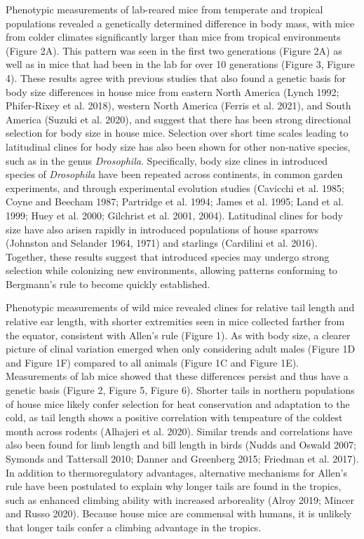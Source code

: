 \documentclass[]{article}
\begin{document}
Phenotypic measurements of lab-reared mice from temperate and tropical
populations revealed a genetically determined difference in body mass,
with mice from colder climates significantly larger than mice from
tropical environments (Figure 2A). This pattern was seen in the first
two generations (Figure 2A) as well as in mice that had been in the lab
for over 10 generations (Figure 3, Figure 4). These results agree with
previous studies that also found a genetic basis for body size
differences in house mice from eastern North America (Lynch 1992;
Phifer-Rixey et al. 2018), western North America (Ferris et al. 2021),
and South America (Suzuki et al. 2020), and suggest that there has been
strong directional selection for body size in house mice. Selection over
short time scales leading to latitudinal clines for body size has also
been shown for other non-native species, such as in the genus
\emph{Drosophila}. Specifically, body size clines in introduced species
of \emph{Drosophila} have been repeated across continents, in common
garden experiments, and through experimental evolution studies (Cavicchi
et al. 1985; Coyne and Beecham 1987; Partridge et al. 1994; James et al.
1995; Land et al. 1999; Huey et al. 2000; Gilchrist et al. 2001, 2004).
Latitudinal clines for body size have also arisen rapidly in introduced
populations of house sparrows (Johnston and Selander 1964, 1971) and
starlings (Cardilini et al. 2016). Together, these results suggest that
introduced species may undergo strong selection while colonizing new
environments, allowing patterns conforming to Bergmann's rule to become
quickly established.

Phenotypic measurements of wild mice revealed clines for relative tail
length and relative ear length, with shorter extremities seen in mice
collected farther from the equator, consistent with Allen's rule (Figure
1). As with body size, a clearer picture of clinal variation emerged
when only considering adult males (Figure 1D and Figure 1F) compared to
all animals (Figure 1C and Figure 1E). Measurements of lab mice showed
that these differences persist and thus have a genetic basis (Figure 2,
Figure 5, Figure 6). Shorter tails in northern populations of house mice
likely confer selection for heat conservation and adaptation to the
cold, as tail length shows a positive correlation with tempeature of the
coldest month across rodents (Alhajeri et al. 2020). Similar trends and
correlations have also been found for limb length and bill length in
birds (Nudds and Oswald 2007; Symonds and Tattersall 2010; Danner and
Greenberg 2015; Friedman et al. 2017). In addition to thermoregulatory
advantages, alternative mechanisms for Allen's rule have been postulated
to explain why longer tails are found in the tropics, such as enhanced
climbing ability with increased arboreality (Alroy 2019; Mincer and
Russo 2020). Because house mice are commensal with humans, it is
unlikely that longer tails confer a climbing advantage in the tropics.
\end{document}
